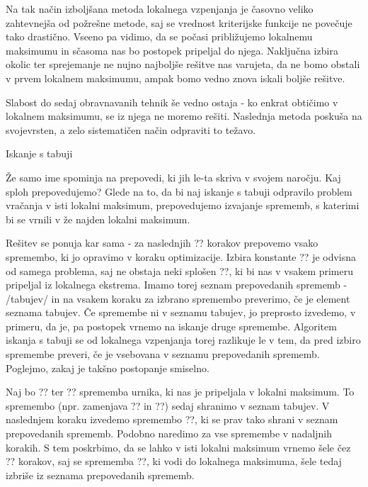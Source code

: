 \documentclass[a4paper,10pt]{article}
\begin{document}
Na tak način izboljšana metoda lokalnega vzpenjanja je časovno veliko zahtevnejša od
požrešne metode, saj se vrednost kriterijske funkcije ne povečuje tako drastično. Vseeno
pa vidimo, da se počasi približujemo lokalnemu maksimumu in sčasoma nas bo postopek
pripeljal do njega. Naključna izbira okolic ter sprejemanje ne nujno najboljše rešitve
nas varujeta, da ne bomo obstali v prvem lokalnem maksimumu, ampak bomo vedno znova
iskali boljše rešitve.

Slabost do sedaj obravnavanih tehnik še vedno ostaja - ko enkrat obtičimo v lokalnem
maksimumu, se iz njega ne moremo rešiti. Naslednja metoda poskuša na svojevrsten, a zelo
sistematičen način odpraviti to težavo.

Iskanje s tabuji %

Že samo ime spominja na prepovedi, ki jih le-ta skriva v svojem naročju. Kaj sploh prepovedujemo?
Glede na to, da bi naj iskanje s tabuji odpravilo problem vračanja v isti lokalni maksimum,
prepovedujemo izvajanje sprememb, s katerimi bi se vrnili v že najden lokalni maksimum.

Rešitev se ponuja kar sama - za naslednjih ?? korakov prepovemo vsako spremembo, ki jo
opravimo v koraku optimizacije. Izbira konstante ?? je odvisna od samega problema, saj
ne obstaja neki splošen ??, ki bi nas v vsakem primeru pripeljal iz lokalnega ekstrema.
Imamo torej seznam prepovedanih sprememb - /tabujev/ in na vsakem koraku za izbrano
spremembo preverimo, če je element seznama tabujev. Če spremembe ni v seznamu tabujev, jo
preprosto izvedemo, v primeru, da je, pa postopek vrnemo na iskanje druge spremembe.
Algoritem iskanja s tabuji se od lokalnega vzpenjanja torej razlikuje le v tem, da pred
izbiro spremembe preveri, če je vsebovana v seznamu prepovedanih sprememb. Poglejmo, zakaj
je takšno postopanje smiselno.

Naj bo ?? ter ?? sprememba urnika, ki nas je pripeljala v lokalni maksimum. To
spremembo (npr. zamenjava ?? in ??) sedaj shranimo v
seznam tabujev. V naslednjem koraku izvedemo spremembo ??, ki se prav tako shrani v
seznam prepovedanih sprememb. Podobno naredimo za vse spremembe v nadaljnih korakih. S
tem poskrbimo, da se lahko v isti lokalni maksimum vrnemo šele čez ?? korakov, saj
se sprememba ??, ki vodi do lokalnega maksimuma, šele tedaj izbriše iz seznama
prepovedanih sprememb.
\end{document}
